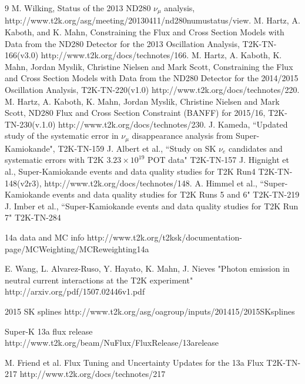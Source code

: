 \begin{thebibliography}{9}
  M. Wilking,
  Status of the 2013 ND280 $\nu_{\mu}$ analysis,\\
  http://www.t2k.org/asg/meeting/20130411/nd280numustatus/view.
  M. Hartz, A. Kaboth, and K. Mahn,
  Constraining the Flux and Cross Section Models with Data from the
  ND280 Detector for the 2013 Oscillation Analysis,
  T2K-TN-166(v3.0)
  http://www.t2k.org/docs/technotes/166.
  M. Hartz, A. Kaboth, K. Mahn, Jordan Myslik, Christine Nielsen and Mark Scott,
  Constraining the Flux and Cross Section Models with Data from the
  ND280 Detector for the 2014/2015 Oscillation Analysis,
  T2K-TN-220(v1.0)
  http://www.t2k.org/docs/technotes/220.
  M. Hartz, A. Kaboth, K. Mahn, Jordan Myslik, Christine Nielsen and Mark Scott,
 ND280 Flux and Cross Section Constraint (BANFF) for 2015/16,
  T2K-TN-230(v.1.0)
  http://www.t2k.org/docs/technotes/230.
J. Kameda,
``Updated study of the systematic error in $\nu_{\mu}$ disappearance analysis from Super-Kamiokande",
T2K-TN-159
J. Albert et al.,
``Study on SK $\nu_e$ candidates and systematic errors with T2K $3.23 \times 10^{19}$ POT data"
T2K-TN-157
   J. Hignight et al.,
   Super-Kamiokande events and data quality studies for T2K Run4
   T2K-TN-148(v2r3),
   http://www.t2k.org/docs/technotes/148.
  A. Himmel et al.,
  ``Super-Kamiokande events and data quality studies for T2K Runs 5 and 6"
  T2K-TN-219
  J. Imber et al.,
  ``Super-Kamiokande events and data quality studies for T2K Run 7"
  T2K-TN-284

%
%

   14a data and MC info
   http://www.t2k.org/t2ksk/documentation-page/MCWeighting/MCReweighting14a

   E. Wang, L. Alvarez-Ruso, Y. Hayato, K. Mahn, J. Nieves
   "Photon emission in neutral current interactions at the T2K experiment"
   http://arxiv.org/pdf/1507.02446v1.pdf

   2015 SK splines
   http://www.t2k.org/asg/oagroup/inputs/201415/2015SKsplines

   Super-K 13a flux release
   http://www.t2k.org/beam/NuFlux/FluxRelease/13arelease
   
   M. Friend et al. 
   Flux Tuning and Uncertainty Updates for the 13a Flux
      T2K-TN-217
   http://www.t2k.org/docs/technotes/217
   

\end{thebibliography}

